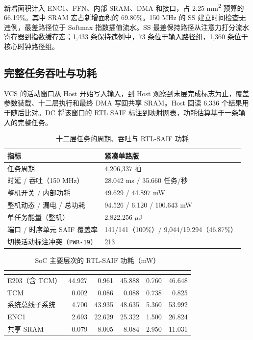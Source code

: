 \documentclass[UTF8,a4paper,zihao=-4,fontset=none,openany,oneside]{ctexrep}
\newcommand{\thcell}[1]{\multicolumn{1}{c}{\sffamily\mdseries\raisebox{\dimexpr2.5pt-.5\height\relax}{\shortstack[c]{#1}}}}
\newcommand{\thleft}[1]{\multicolumn{1}{l}{\sffamily\mdseries\raisebox{\dimexpr2.5pt-.5\height\relax}{\shortstack[l]{#1}}}}
\begin{document}
新增面积计入 ENC1、FFN、内部 SRAM、DMA 和接口，占 2.25 mm\textsuperscript{2} 预算的 66.19\%。其中 SRAM 宏占新增面积的 69.80\%。150 MHz 的 SS 建立时间检查无违例，最差路径位于 Softmax 指数插值流水。SS 最差保持路径从注意力打分流水寄存器到指数缓存宏；1,433 条保持违例中，73 条位于输入路径组，1,360 条位于核心时钟路径组。

\subsection{完整任务吞吐与功耗}

VCS 的活动窗口从 Host 开始写入输入，到 Host 观察到末层完成标志为止，覆盖参数装载、十二层执行和最终 DMA 写回共享 SRAM。Host 回读 6,336 个结果用于随后比对。DC 将该窗口的 RTL SAIF 标注到映射网表，功耗估算基于一条输入的完整任务。

\begin{table}[!htp]\centering\fontsize{10}{13}\selectfont
\caption{十二层任务的周期、吞吐与 RTL-SAIF 功耗}\label{tab:extension-power}
\begin{tabularx}{\textwidth}{@{}L{1.12}L{0.88}@{}}
\toprule
{}
指标 & 紧凑单路版 \\
\midrule
任务周期 & 4,206,337 拍 \\
时延 / 吞吐（150 MHz） & 28.042 ms / 35.660 任务/秒 \\
整机开关 / 内部功耗 & 49.629 / 44.897 mW \\
整机动态 / 漏电 / 总功耗 & 94.526 / 6.120 / 100.643 mW \\
单任务能量（整机） & 2,822.256 $\mu$J \\
端口 / 时序单元 SAIF 覆盖率 & 141/141（100\%）/ 9,044/19,294（46.87\%） \\
切换活动标注冲突（\texttt{PWR-19}） & 213 \\
\bottomrule
\end{tabularx}
\end{table}

\begin{table}[!htp]\centering\fontsize{10}{13}\selectfont
\caption{SoC 主要层次的 RTL-SAIF 功耗（mW）}\label{tab:extension-power-hierarchy}
\begin{tabular}{@{}lrrrrr@{}}
\toprule
\rowcolor{TableHeader}
\thleft{层次} & \thcell{开关} & \thcell{内部} & \thcell{动态} & \thcell{漏电} & \thcell{总计} \\
\midrule
E203（含 TCM） & 44.927 & 0.961 & 45.888 & 0.760 & 46.648 \\
\quad TCM & 0.002 & 0.086 & 0.088 & 0.738 & 0.825 \\
系统总线子系统 & 4.700 & 43.935 & 48.635 & 5.360 & 53.992 \\
\quad ENC1 & 2.693 & 22.629 & 25.322 & 1.500 & 26.824 \\
\quad 共享 SRAM & 0.079 & 8.005 & 8.084 & 2.950 & 11.031 \\
\bottomrule
\end{tabular}
\end{table}
\end{document}

